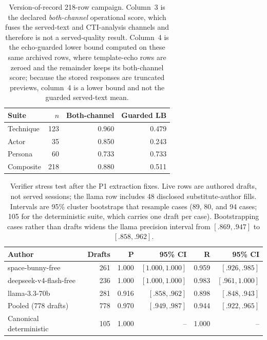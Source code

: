 \begin{table}[t]
\centering
\caption{Version-of-record 218-row campaign. Column~3 is the declared
\emph{both-channel} operational score, which fuses the served-text and
CTI-analysis channels and therefore is not a served-quality result. Column~4
is the echo-guarded lower bound computed on these same archived rows, where
template-echo rows are zeroed and the remainder keeps its both-channel score;
because the stored responses are truncated previews, column~4 is a lower
bound and not the guarded served-text mean.}
\label{tab:live}
\scriptsize
\setlength{\tabcolsep}{4pt}
\begin{tabular}{lrrr}
\toprule
Suite & $n$ & Both-channel & Guarded LB \\
\midrule
Technique & 123 & 0.960 & 0.479 \\
Actor & 35 & 0.850 & 0.243 \\
Persona & 60 & 0.733 & 0.733 \\
\midrule
Composite & 218 & 0.880 & 0.511 \\
\bottomrule
\end{tabular}
\end{table}

\begin{table}[t]
\centering
\caption{Verifier stress test after the P1 extraction fixes. Live rows are
authored drafts, not served sessions; the llama row includes 48 disclosed
substitute-author fills. Intervals are 95\% cluster bootstraps that resample
cases (89, 80, and 94 cases; 105 for the deterministic suite, which carries one
draft per case). Bootstrapping cases rather than drafts widens the llama
precision interval from $[.869,.947]$ to $[.858,.962]$.}
\label{tab:verifier-cross-family}
\scriptsize
\setlength{\tabcolsep}{2.5pt}
\begin{tabular}{lrrrrr}
\toprule
Author & Drafts & P & 95\% CI & R & 95\% CI \\
\midrule
space-bunny-free & 261 & 1.000 & $[1.000,1.000]$ & 0.959 & $[.926,.985]$ \\
deepseek-v4-flash-free & 236 & 1.000 & $[1.000,1.000]$ & 0.983 & $[.961,1.000]$ \\
llama-3.3-70b & 281 & 0.916 & $[.858,.962]$ & 0.898 & $[.848,.943]$ \\
\midrule
Pooled (778 drafts) & 778 & 0.970 & $[.949,.987]$ & 0.944 & $[.922,.965]$ \\
Canonical deterministic & 105 & 1.000 & -- & 1.000 & -- \\
\bottomrule
\end{tabular}
\end{table}

